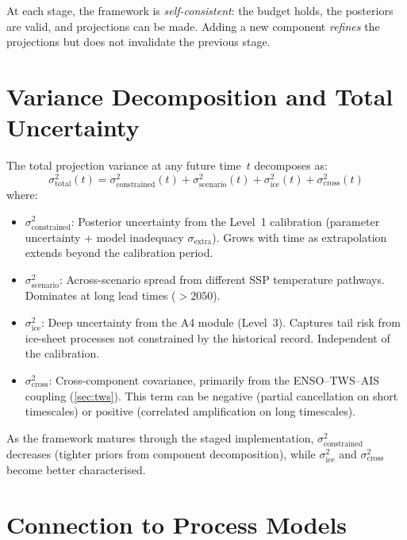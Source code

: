 \documentclass[11pt]{article}
\newcommand{\sigextra}{\sigma_{\text{extra}}}
\begin{document}
At each stage, the framework is \emph{self-consistent}: the budget holds, the posteriors are valid, and projections can be made.  Adding a new component \emph{refines} the projections but does not invalidate the previous stage.


\section{Variance Decomposition and Total Uncertainty}
\label{sec:variance}

The total projection variance at any future time~$t$ decomposes as:
\begin{equation}
  \sigma_{\text{total}}^2(t) = \sigma_{\text{constrained}}^2(t)
    + \sigma_{\text{scenario}}^2(t)
    + \sigma_{\text{ice}}^2(t)
    + \sigma_{\text{cross}}^2(t)
  \label{eq:variance-decomp}
\end{equation}
where:
\begin{itemize}
  \item $\sigma_{\text{constrained}}^2$: Posterior uncertainty from the Level~1 calibration (parameter uncertainty + model inadequacy $\sigextra$).  Grows with time as extrapolation extends beyond the calibration period.
  \item $\sigma_{\text{scenario}}^2$: Across-scenario spread from different SSP temperature pathways.  Dominates at long lead times ($> 2050$).
  \item $\sigma_{\text{ice}}^2$: Deep uncertainty from the A4 module (Level~3).  Captures tail risk from ice-sheet processes not constrained by the historical record.  Independent of the calibration.
  \item $\sigma_{\text{cross}}^2$: Cross-component covariance, primarily from the ENSO--TWS--AIS coupling (\cref{sec:tws}).  This term can be negative (partial cancellation on short timescales) or positive (correlated amplification on long timescales).
\end{itemize}

As the framework matures through the staged implementation, $\sigma_{\text{constrained}}^2$ decreases (tighter priors from component decomposition), while $\sigma_{\text{ice}}^2$ and $\sigma_{\text{cross}}^2$ become better characterised.


\section{Connection to Process Models}
\label{sec:process-models}
\end{document}
